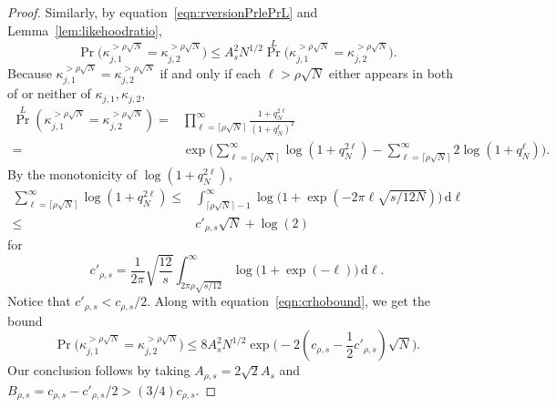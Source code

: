 \documentclass{article}
\theoremstyle{definition}
\renewcommand{\leq}{\leqslant}
\newcommand{\rd}{\,\mathrm{d}}
\begin{document}
\begin{proof}
Similarly, by equation~\eqref{eqn:rversionPrlePrL} and Lemma~\ref{lem:likehoodratio},
$$\Pr\Big(\kappa^{>\rho \sqrt{N}}_{j,1}=\kappa^{>\rho \sqrt{N}}_{j,2}\Big)\leq A^2_s N^{1/2}{\textstyle\Pr}^L\Big(\kappa^{>\rho \sqrt{N}}_{j,1}=\kappa^{>\rho \sqrt{N}}_{j,2}\Big).$$
Because $\kappa^{>\rho \sqrt{N}}_{j,1}=\kappa^{>\rho \sqrt{N}}_{j,2}$ if and only if each $\ell>\rho \sqrt{N}$ either appears in both of or neither of $\kappa_{j,1},\kappa_{j,2}$,
\begin{align*}
{\textstyle\Pr}^L(\kappa^{>\rho \sqrt{N}}_{j,1}=\kappa^{>\rho \sqrt{N}}_{j,2})
=& \prod_{\ell=\lceil\rho\sqrt{N}\rceil}^\infty\frac{1+q^{2\ell}_N}{(1+q^\ell_N)^2}\\
=&\exp\Big(\sum_{\ell=\lceil\rho\sqrt{N}\rceil}^\infty\log(1+q^{2\ell}_N)-\sum_{\ell=\lceil\rho\sqrt{N}\rceil}^\infty 2\log(1+q^\ell_N)\Big).
\end{align*}
By the monotonicity of $\log(1+q^{2\ell}_N)$,
\begin{align*}
        \sum_{\ell=\lceil\rho\sqrt{N}\rceil}^\infty \log(1+q^{2\ell}_N)
        \leq&\int_{\lceil\rho\sqrt{N}\rceil-1}^\infty \log\Big(1+\exp(-2\pi\ell\sqrt{s/12N})\Big)\rd \ell \\
        \leq &c'_{\rho,s}\sqrt{N} +\log(2)
    \end{align*}
    for 
    \begin{equation*}
c'_{\rho,s}=\frac{1}{2\pi}\sqrt{\frac{12}{s}}\int_{2\pi\rho\sqrt{s/12}}^\infty \log\Big(1+\exp(-\ell)\Big)\rd \ell.
\end{equation*}
Notice that $c'_{\rho,s}<c_{\rho,s}/2$. Along with equation~\eqref{eqn:crhobound}, we get the bound
$$\Pr\Big(\kappa^{>\rho \sqrt{N}}_{j,1}=\kappa^{>\rho \sqrt{N}}_{j,2}\Big)\leq 8 A^2_s N^{1/2} \exp\Big(-2(c_{\rho,s}-\frac{1}{2}c'_{\rho,s})\sqrt{N}\Big). $$
Our conclusion follows by taking $A_{\rho,s}=2\sqrt{2}A_s$ and $B_{\rho,s}=c_{\rho,s}-c'_{\rho,s}/2>(3/4)c_{\rho,s}.$
\end{proof}
\end{document}
